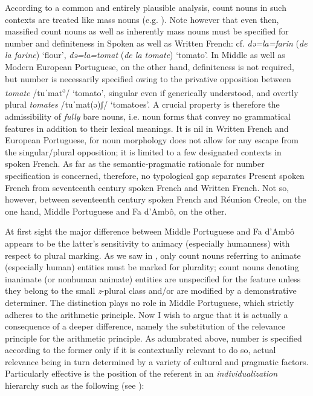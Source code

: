 \documentclass[output=paper]{langscibook}
\begin{document}
According to a common and entirely plausible analysis, count nouns in such contexts are treated like mass nouns (e.g. \citealt{KwonZribi-Hertz2006}). Note however that even then, massified count nouns as well as inherently mass nouns must be specified for number and definiteness in Spoken as well as Written French: cf. \textit{də=la=farin} (\textit{de la farine}) ‘flour’, \textit{də=la=tomat} (\textit{de la tomate}) ‘tomato’. In Middle as well as Modern European Portuguese, on the other hand, definiteness is not required, but number is necessarily specified owing to the privative opposition between \textit{tomate} /tuˈmat\textsuperscript{ə}/ ‘tomato’, singular even if generically understood, and overtly plural \textit{tomates} /tuˈmat(ə)ʃ/ ‘tomatoes’. A crucial property is therefore the admissibility of \textit{fully} bare nouns, i.e. noun forms that convey no grammatical features in addition to their lexical meanings. It is nil in Written French and European Portuguese, for noun morphology does not allow for any escape from the singular/plural opposition; it is limited to a few designated contexts in spoken French. As far as the semantic-pragmatic rationale for number specification is concerned, therefore, no typological gap separates Present spoken French from seventeenth century spoken French and Written French. Not so, however, between seventeenth century spoken French and Réunion Creole, on the one hand, Middle Portuguese and Fa d’Ambô, on the other.

At first sight the major difference between Middle Portuguese and Fa d’Ambô appears to be the latter’s sensitivity to animacy (especially humanness) with respect to plural marking. As we saw in , only count nouns referring to animate (especially human) entities must be marked for plurality; count nouns denoting inanimate (or nonhuman animate) entities are unspecified for the feature unless they belong to the small \textit{z}{}-plural class and/or are modified by a demonstrative determiner. The distinction plays no role in Middle Portuguese, which strictly adheres to the arithmetic principle. Now I wish to argue that it is actually a consequence of a deeper difference, namely the substitution of the relevance principle for the arithmetic principle. As adumbrated above, number is specified according to the former only if it is contextually relevant to do so, actual relevance being in turn determined by a variety of cultural and pragmatic factors. Particularly effective is the position of the referent in an \textit{individualization} hierarchy such as the following (see \citealt{Corbett2000}):
\end{document}

